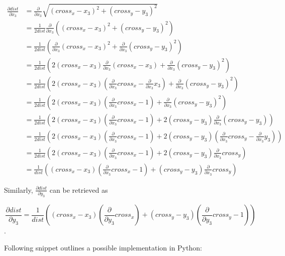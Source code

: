 \documentclass[fleqn]{article}
\begin{document}
\begin{equation}
\begin{aligned}
    \frac{\partial dist}{\partial x_3}
    &= \frac{\partial}{\partial x_3} \sqrt{(cross_x - x_3)^2 + (cross_y - y_3)^2} \\
    &= \frac{1}{2 dist} \frac{\partial}{\partial x_3} ((cross_x - x_3)^2 + (cross_y - y_3)^2) \\
    &= \frac{1}{2 dist} (\frac{\partial}{\partial x_3} (cross_x - x_3)^2 + \frac{\partial}{\partial x_3} (cross_y - y_3)^2) \\
    &= \frac{1}{2 dist} (2 (cross_x - x_3) \frac{\partial}{\partial x_3} (cross_x - x_3)
    + \frac{\partial}{\partial x_3} (cross_y - y_3)^2) \\
    &= \frac{1}{2 dist} (2 (cross_x - x_3) (\frac{\partial}{\partial x_3} cross_x - \frac{\partial}{\partial x_3} x_3)
    + \frac{\partial}{\partial x_3} (cross_y - y_3)^2) \\
    &= \frac{1}{2 dist} (2 (cross_x - x_3) (\frac{\partial}{\partial x_3} cross_x - 1)
    + \frac{\partial}{\partial x_3} (cross_y - y_3)^2) \\
    &= \frac{1}{2 dist} (2 (cross_x - x_3) (\frac{\partial}{\partial x_3} cross_x - 1)
    + 2 (cross_y - y_3) \frac{\partial}{\partial x_3} (cross_y - y_3)) \\
    &= \frac{1}{2 dist} (2 (cross_x - x_3) (\frac{\partial}{\partial x_3} cross_x - 1)
    + 2 (cross_y - y_3) (\frac{\partial}{\partial x_3} cross_y - \frac{\partial}{\partial x_3} y_3)) \\
    &= \frac{1}{2 dist} (2 (cross_x - x_3) (\frac{\partial}{\partial x_3} cross_x - 1)
    + 2 (cross_y - y_3) \frac{\partial}{\partial x_3} cross_y)\\
    &= \frac{1}{dist} ((cross_x - x_3) (\frac{\partial}{\partial x_3} cross_x - 1)
    + (cross_y - y_3) \frac{\partial}{\partial x_3} cross_y)
\end{aligned}
\end{equation}

Similarly, $\frac{\partial dist}{\partial y_3}$ can be retrieved as

$$\frac{\partial dist}{\partial y_3} = \frac{1}{dist} ((cross_x - x_3) (\frac{\partial}{\partial y_3} cross_x)
    + (cross_y - y_3) (\frac{\partial}{\partial y_3} cross_y - 1))$$.

Following snippet outlines a possible implementation in Python:
\end{document}
